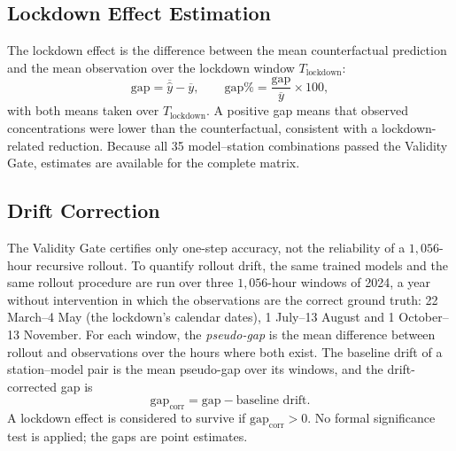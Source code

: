 \subsection{Lockdown Effect Estimation}
\label{subsection:lockdown-effect}
The lockdown effect is the difference between the mean counterfactual prediction and the mean observation over the lockdown window $T_{\text{lockdown}}$:
\begin{equation}
    \text{gap} = \overline{\hat{y}} - \overline{y}, \qquad \text{gap\%} = \frac{\text{gap}}{\overline{y}} \times 100 ,
\end{equation}
with both means taken over $T_{\text{lockdown}}$. A positive gap means that observed concentrations were lower than the counterfactual, consistent with a lockdown-related reduction. Because all 35 model--station combinations passed the Validity Gate, estimates are available for the complete matrix.

\subsection{Drift Correction}
\label{subsection:drift-correction}
The Validity Gate certifies only one-step accuracy, not the reliability of a $1{,}056$-hour recursive rollout. To quantify rollout drift, the same trained models and the same rollout procedure are run over three $1{,}056$-hour windows of 2024, a year without intervention in which the observations are the correct ground truth: 22 March--4 May (the lockdown's calendar dates), 1 July--13 August and 1 October--13 November. For each window, the \emph{pseudo-gap} is the mean difference between rollout and observations over the hours where both exist. The baseline drift of a station--model pair is the mean pseudo-gap over its windows, and the drift-corrected gap is
\begin{equation}
    \text{gap}_{\text{corr}} = \text{gap} - \text{baseline drift}.
\end{equation}
A lockdown effect is considered to survive if $\text{gap}_{\text{corr}} > 0$. No formal significance test is applied; the gaps are point estimates.

